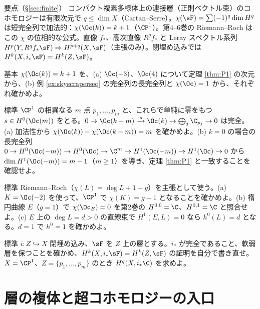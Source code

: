 \begin{keybox}{要点（§\ref{sec:finite}）}
コンパクト複素多様体上の連接層（正則ベクトル束）のコホモロジーは有限次元で $q\le\dim X$（Cartan--Serre）。$\chi(\sF)=\sum(-1)^q\dim H^q$ は短完全列で加法的：$\chi(\Oc(k))=k+1$（$\CP^1$）。第4--6巻の Riemann--Roch はこの $\chi$ の位相的な公式。直像 $f_*$、高次直像 $R^qf_*$ と Leray スペクトル系列 $H^p(Y,R^qf_*\sF)\Rightarrow H^{p+q}(X,\sF)$（主張のみ）。閉埋め込みでは $H^k(X,i_*\sF)=H^k(Z,\sF)$。
\end{keybox}

\begin{prob}{基本}\label{p:chiOk}
$\chi(\Oc(k))=k+1$ を、(a) $\Oc(-3)$、$\Oc(4)$ について定理 \ref{thm:P1} の次元から、(b) 例 \ref{ex:skyscraperseq} の完全列の長完全列と $\chi(\Oc)=1$ から、それぞれ確かめよ。
\end{prob}
\begin{prob}{標準}\label{p:Zpoints}
$\CP^1$ の相異なる $m$ 点 $p_1,\dots,p_m$ と、これらで単純に零をもつ $s\in H^0(\Oc(m))$ をとる。$0\to\Oc(k-m)\xrightarrow{\cdot s}\Oc(k)\to\bigoplus_{j}\C_{p_j}\to0$ は完全。(a) 加法性から $\chi(\Oc(k))-\chi(\Oc(k-m))=m$ を確かめよ。(b) $k=0$ の場合の長完全列 $0\to H^0(\Oc(-m))\to H^0(\Oc)\to\C^m\to H^1(\Oc(-m))\to H^1(\Oc)\to0$ から $\dim H^1(\Oc(-m))=m-1$（$m\ge1$）を導き、定理 \ref{thm:P1} と一致することを確認せよ。
\end{prob}
\begin{prob}{標準}\label{p:RRcheck}
Riemann--Roch（$\chi(L)=\deg L+1-g$）を主張として使う。(a) $K=\Oc(-2)$ を使って、$\CP^1$ で $\chi(K)=g-1$ となることを確かめよ。(b) 楕円曲線 $E$（$g=1$）で $\chi(\Oc_E)=0$ を第2巻の $H^{0,0}=\C$、$H^{0,1}=\C$ と照合せよ。(c) $E$ 上の $\deg L=d>0$ の直線束で $H^1(E,L)=0$ なら $h^0(L)=d$ となる。$d=1$ で $h^0=1$ を確かめよ。
\end{prob}
\begin{prob}{標準}\label{p:closedembProb}
$i:Z\hookrightarrow X$ 閉埋め込み、$\sF$ を $Z$ 上の層とする。$i_*$ が完全であること、軟弱層を保つことを確かめ、$H^k(X,i_*\sF)=H^k(Z,\sF)$ の証明を自分で書き直せ。$X=\CP^1$、$Z=\{p_1,\dots,p_m\}$ のとき $H^q(X,i_*\C)$ を求めよ。
\end{prob}

\section{層の複体と超コホモロジーの入口}\label{sec:hyper}


